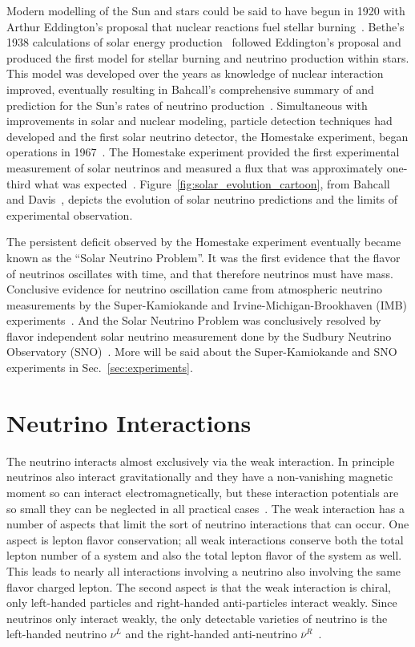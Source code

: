 Modern modelling of the Sun and stars could be said to have begun in 1920 with
Arthur Eddington's proposal that nuclear reactions fuel stellar burning~\citep{eddington}.
Bethe's 1938 calculations of solar energy production~\citep{bethe1, bethe2}
followed Eddington's proposal and produced the first model for stellar burning
and neutrino production within stars.
This model was developed over the years as knowledge of nuclear interaction
improved, eventually resulting in Bahcall's comprehensive summary of and
prediction for the Sun's rates of neutrino
production~\citep{bahcall_solar_neutrinos_theory}.
Simultaneous with improvements in solar and nuclear modeling,
particle detection techniques had developed and
the first solar neutrino detector, the Homestake experiment, began
operations in 1967~\citep{homestake_initial}.
The Homestake experiment provided the first experimental measurement
of solar neutrinos and measured a flux that was approximately one-third what was expected~\citep{homestake}.
Figure~\ref{fig:solar_evolution_cartoon}, from Bahcall and Davis~\citep{bahcall_evolution},
depicts the evolution of solar neutrino predictions and
the limits of experimental observation.

The persistent deficit observed by the Homestake experiment
eventually became known as the ``Solar Neutrino Problem''.
It was the first evidence that the flavor of neutrinos oscillates with
time, and that therefore neutrinos must have mass.
Conclusive evidence for neutrino oscillation came from  atmospheric neutrino
measurements by the Super-Kamiokande and Irvine-Michigan-Brookhaven (IMB)
experiments~\citep{superk_atmospherics, imb_atmospherics}.
And the Solar Neutrino Problem was conclusively resolved by flavor
independent solar neutrino measurement done
by the Sudbury Neutrino Observatory (SNO)~\citep{sno_first, sno_second, solar_nu_problem}.
More will be said about the Super-Kamiokande and SNO experiments in
Sec.~\ref{sec:experiments}.

\section{Neutrino Interactions}
\label{sec:neutrino_interactions}
The neutrino interacts almost exclusively via the weak interaction.
In principle neutrinos also interact gravitationally and they have a non-vanishing
magnetic moment so can interact electromagnetically, but these
interaction potentials are so small they can be neglected in all practical
cases~\citep{neutrino_magmom}.
The weak interaction has a number of aspects that limit the sort of neutrino
interactions that can occur. One aspect is lepton flavor conservation;
all weak interactions conserve both the total lepton number of a system and also
the total lepton flavor of the system as well.
This leads to nearly all interactions involving a neutrino also involving the
same flavor charged lepton.
The second aspect is that the weak interaction is chiral,
only left-handed particles and right-handed anti-particles interact weakly.
Since neutrinos only interact weakly, the only detectable varieties of neutrino
is the left-handed neutrino $\nu^{L}$  and the right-handed
anti-neutrino $\overline{\nu}^{R}$~\citep{weinberg}.

